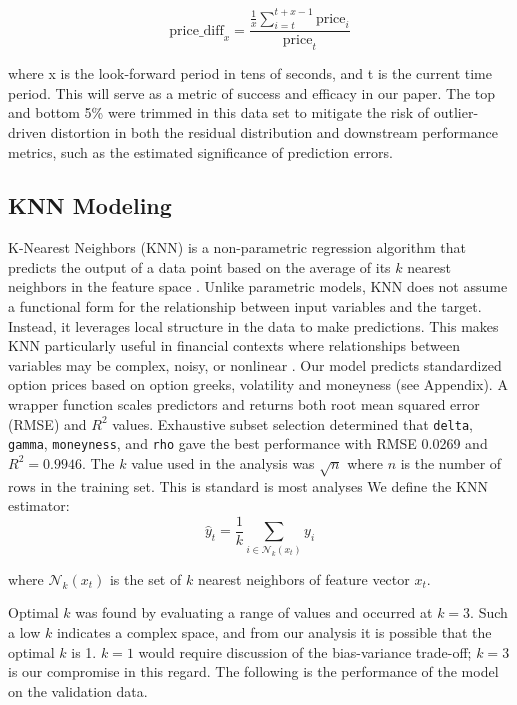 \documentclass{article}
\begin{document}
\[
\text{price\_diff}_x = \frac{\frac{1}{x}\sum_{i=t}^{t+x-1}\text{price}_i}{\text{price}_t}
\]

where x is the look-forward period in tens of seconds, and t is the current time period. This will serve as a metric of success and efficacy in our paper. The top and bottom 5\% were trimmed in this data set to mitigate the risk of outlier-driven distortion in both the residual distribution and downstream performance metrics, such as the estimated significance of prediction errors.

\subsection{KNN Modeling}

K-Nearest Neighbors (KNN) is a non-parametric regression algorithm that predicts the output of a data point based on the average of its $k$ nearest neighbors in the feature space \cite{cover1967nearest}. Unlike parametric models, KNN does not assume a functional form for the relationship between input variables and the target. Instead, it leverages local structure in the data to make predictions. This makes KNN particularly useful in financial contexts where relationships between variables may be complex, noisy, or nonlinear \cite{altman1992introduction}. Our model predicts standardized option prices based on option greeks, volatility and moneyness (see Appendix). A wrapper function scales predictors and returns both root mean squared error (RMSE) and $R^2$ values. Exhaustive subset selection determined that \verb|delta|, \verb|gamma|, \verb|moneyness|, and \verb|rho| gave the best performance with RMSE 0.0269 and \( R^2 = 0.9946 \). The $k$ value used in the analysis was $\sqrt{n}$ where $n$ is the number of rows in the training set. This is standard is most analyses We define the KNN estimator:
\[
\hat{y}_t = \frac{1}{k} \sum_{i \in \mathcal{N}_k(x_t)} y_i
\]

where \( \mathcal{N}_k(x_t) \) is the set of \( k \) nearest neighbors of feature vector \( x_t \). \

Optimal $k$ was found by evaluating a range of values and occurred at $k=3$. Such a low $k$ indicates a complex space, and from our analysis it is possible that the optimal $k$ is 1. $k=1$ would require discussion of the bias-variance trade-off; $k=3$ is our compromise in this regard. The following is the performance of the model on the validation data.
\end{document}
